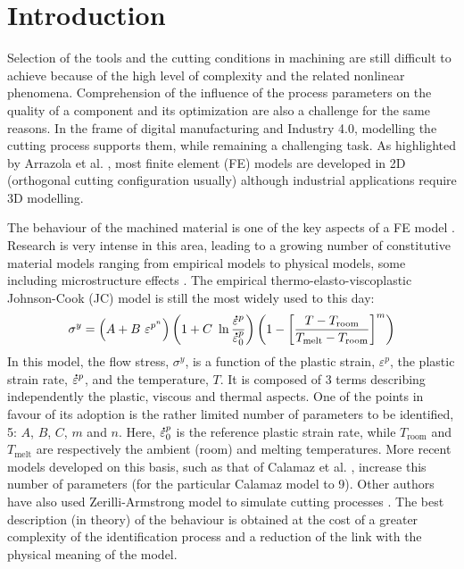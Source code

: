 \documentclass[preprint,12pt,times]{elsarticle}
\newcommand{\mdot}[1]{\accentset{\mbox{\bfseries .}}{#1}} %
\begin{document}
\linenumbers

\section{Introduction}
\label{Intro}

Selection of the tools and the cutting conditions in machining are still difficult to achieve because of the high level of complexity and the related nonlinear phenomena. Comprehension of the influence of the process parameters on the quality of a component and its optimization are also a challenge for the same reasons. In the frame of digital manufacturing and Industry 4.0, modelling the cutting process supports them, while remaining a challenging task. As highlighted by Arrazola et al. \cite{arrazola_Recent_2013}, most finite element (FE) models are developed in 2D (orthogonal cutting configuration usually) although industrial applications require 3D modelling.

The behaviour of the machined material is one of the key aspects of a FE model \cite{arrazola_Recent_2013, melkote_Advances_2017}. Research is very intense in this area, leading to a growing number of constitutive material models ranging from empirical models to physical models, some including microstructure effects \cite{melkote_Advances_2017}. The empirical thermo-elasto-viscoplastic Johnson-Cook (JC) model \cite{johnson_Constitutive_1983} is still the most widely used to this day:
%
\begin{equation}\label{eq:J-C}
	\sigma^y = \left(A + B\ \varepsilon^{p^n} \right) \left(1 + C\ \ln\frac{\mdot{\varepsilon}^p}{\mdot{\varepsilon}_0^p}\right) \left(1 - \left[\frac{T - T_{\text{room}}}{T_{\text{melt}} - T_{\text{room}}}\right]^{m}\right)
\end{equation}
%
In this model, the flow stress, $\sigma^y$, is a function of the plastic strain, $\varepsilon^p$, the plastic strain rate, $\mdot{\varepsilon}^p$, and the temperature, $T$. It is composed of 3 terms describing independently the plastic, viscous and thermal aspects. One of the points in favour of its adoption is the rather limited number of parameters to be identified, 5: $A$, $B$, $C$, $m$ and $n$. Here, $\mdot{\varepsilon}_0^p$ is the reference plastic strain rate, while $T_{\text{room}}$ and $T_{\text{melt}}$ are respectively the ambient (room) and melting temperatures. More recent models developed on this basis, such as that of Calamaz et al. \cite{calamaz_New_2008}, increase this number of parameters (for the particular Calamaz model to 9). Other authors have also used Zerilli-Armstrong model to simulate cutting processes \cite{gurusamy_Performance_2017}. The best description (in theory) of the behaviour is obtained at the cost of a greater complexity of the identification process and a reduction of the link with the physical meaning of the model.
\end{document}
